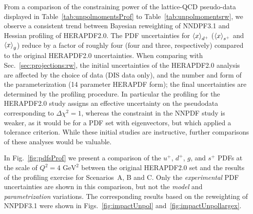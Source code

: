 From a comparison of the constraining power of the lattice-QCD pseudo-data  
displayed in Table~\ref{tab:unpolmomentsProf} to Table~\ref{tab:unpolmomentsrw},
we observe a consistent trend between Bayesian reweighting of NNDPF3.1 and 
Hessian profiling of HERAPDF2.0.
%
The PDF uncertainties for $\left\langle x\right\rangle_{d^+}$ ($\left\langle x\right\rangle_{s^+}$
and  $\left\langle x\right\rangle_g$) reduce by a factor of roughly
four (four and three, respectively) compared to the original
HERAPDF2.0 uncertainties.
%
When comparing with Sec.~\ref{sec:projections:rw},
the initial uncertainties of the HERAPDF2.0  analysis 
are affected by the choice of data (DIS data only), and 
the number and form of the parameterization (14 parameter HERAPDF form);
the final uncertainties are determined by the profiling procedure. 
%
In particular the profiling for the HERAPDF2.0 study assigns an effective 
uncertainty on the pseudodata corresponding to $\Delta\chi^2=1$, whereas the 
constraint in the NNPDF study is weaker, as it would be for a PDF set with 
eigenvectors, but which applied a tolerance criterion. 
%
While these initial studies are instructive, 
further comparisons of these analyses would be valuable. 

In Fig.~\ref{fig:pdfsProf} we present a comparison of the
$u^+$, $d^+$, $g$, and $s^+$ PDFs at the scale of $Q^2=4\text{ GeV}^2$
between the original  HERAPDF2.0 set and the results of the profiling
exercise for Scenarios~A, B and C.
%
Only the {\it experimental} PDF uncertainties are shown in this comparison,
but not the {\it model} and {\it parametrization} variations.
%
The corresponding results based on the reweighting
of NNPDF3.1 were shown in Figs.~\ref{fig:impactUnpol}
and~\ref{fig:impactUnpollargex}.

